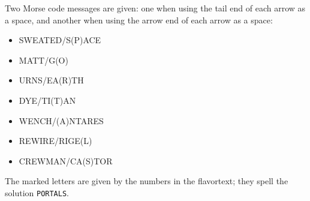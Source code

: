 Two Morse code messages are given: one when using the tail end of each
arrow as a space, and another when using the arrow end of each arrow
as a space:

\begin{itemize}
\item SWEATED/S(P)ACE
\item MATT/G(O)
\item URNS/EA(R)TH
\item DYE/TI(T)AN
\item WENCH/(A)NTARES
\item REWIRE/RIGE(L)
\item CREWMAN/CA(S)TOR  
\end{itemize}

The marked letters are given by the numbers in the flavortext;
they spell the solution \texttt{PORTALS}.
